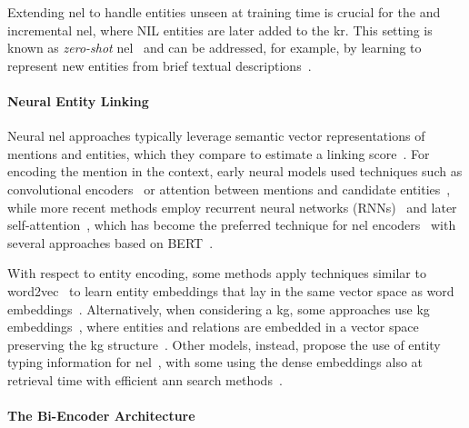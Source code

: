 Extending \ac{nel} to handle entities unseen at training time is crucial for the \nilchallenge and incremental \ac{nel}, where NIL entities are later added to the \ac{kr}. This setting is known as \emph{zero-shot} \ac{nel}~\cite{logeswaran-etal-2019-zero} and can be addressed, for example, by learning to represent new entities from brief textual descriptions~\cite{logeswaran-etal-2019-zero,blink}.

\paragraph{Neural Entity Linking}
Neural \ac{nel} approaches typically leverage semantic vector representations of mentions and entities, which they compare to estimate a linking score~\cite{Sevgili2022NeuralEL}. For encoding the mention in the context, early neural models used techniques such as convolutional encoders~\cite{francis-landau-etal-2016-capturing,nguyen-etal-2016-joint,sorokin-gurevych-2018-mixing,sun-etal-2015-modeling} or attention between mentions and candidate entities~\cite{ganea-hofmann-2017-deep,le-titov-2019-boosting}, while more recent methods employ recurrent neural networks (RNNs)~\cite{kolitsas-etal-2018-end,gupta-etal-2017-entity,martins-etal-2019-joint} and later self-attention~\cite{logeswaran-etal-2019-zero,blink,yamada-etal-2022-global}, which has become the preferred technique for \ac{nel} encoders~\cite{Sevgili2022NeuralEL} with several approaches based on BERT~\cite{logeswaran-etal-2019-zero,blink,yamada-etal-2022-global}.

With respect to entity encoding, some methods apply techniques similar to word2vec~\cite{mikolov2013} to learn entity embeddings that lay in the same vector space as word embeddings~\cite{moreno_combining_word_entity_embeddings_2017,yamada-etal-2017-learning}. Alternatively, when considering a \ac{kg}, some approaches use \acl{kg} embeddings~\cite{pnel_pointer_network_based_end_to_end_entity_linking_2020,sorokin-gurevych-2018-mixing}, where entities and relations are embedded in a vector space preserving the \ac{kg} structure~\cite{kge_survey_2017}.
Other models, instead, propose the use of entity typing information for \ac{nel}~\cite{gupta-etal-2017-entity,khalife-vazirgiannis-2019-scalable,Raiman_Raiman_2018,Onoe_Durrett_2020,Heist2023nastylinker}, with some using the dense embeddings also at retrieval time with efficient \acf{ann} search methods~\cite{gillick-etal-2019-learning,blink}.

\paragraph{The Bi-Encoder Architecture}

